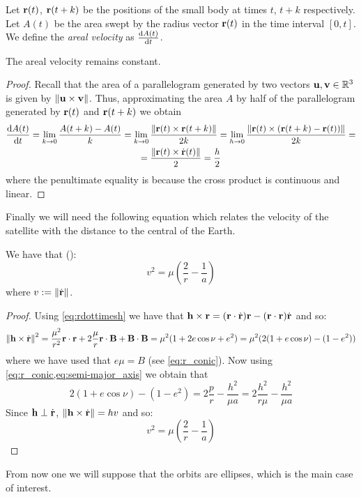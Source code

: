 \documentclass[../main.tex]{subfiles}
\begin{document}
\begin{definition}
  Let $\boldsymbol{\mathrm{r}}(t)$, $\boldsymbol{\mathrm{r}}(t+k)$ be the positions of the small body at times $t$, $t+k$ respectively. Let $A(t)$ be the area swept by the radius vector $\boldsymbol{\mathrm{r}}(t)$ in the time interval $[0,t]$. We define the \emph{areal velocity} as $\dv{A(t)}{t}$.
\end{definition}
\begin{proposition}
  The areal velocity remains constant.
\end{proposition}
\begin{proof}
  Recall that the area of a parallelogram generated by two vectors $\boldsymbol{\mathrm{u}},\boldsymbol{\mathrm{v}}\in\mathbb{R}^3$ is given by $\left\|\boldsymbol{\mathrm{u}}\times\boldsymbol{\mathrm{v}}\right\|$. Thus, approximating the area $A$ by half of the parallelogram generated by $\boldsymbol{\mathrm{r}}(t)$ and ${\boldsymbol{\mathrm{r}}}(t+k)$ we obtain
  \begin{multline}\label{eq:areal_velocity}
    \dv{A(t)}{t}=\lim_{k\to 0}\frac{A(t+k)-A(t)}{k}=\lim_{k\to 0}\frac{\left\|\boldsymbol{\mathrm{r}}(t)\times\boldsymbol{\mathrm{r}}(t+k)\right\|}{2k}=\lim_{h\to 0}\frac{\left\|\boldsymbol{\mathrm{r}}(t)\times(\boldsymbol{\mathrm{r}}(t+k)-\boldsymbol{\mathrm{r}}(t))\right\|}{2k}=\\
    =\frac{\left\|\boldsymbol{\mathrm{r}}(t)\times\dot{\boldsymbol{\mathrm{r}}}(t)\right\|}{2}=\frac{h}{2}
  \end{multline}
  where the penultimate equality is because the cross product is continuous and linear.
\end{proof}
Finally we will need the following equation which relates the velocity of the satellite with the distance to the central of the Earth.
\begin{proposition}
  We have that (\cite{montenbruck}):
  \begin{equation}\label{eq:visviva}
    v^2=\mu\left(\frac{2}{r}-\frac{1}{a}\right)
  \end{equation}
  where $v:=\left\|\dot{\boldsymbol{\mathrm{r}}}\right\|$.
\end{proposition}
\begin{proof}
  Using \cref{eq:rdottimesh} we have that $\boldsymbol{\mathrm{h}}\times\boldsymbol{\mathrm{r}}=(\boldsymbol{\mathrm{r}}\cdot\dot{\boldsymbol{\mathrm{r}}})\boldsymbol{\mathrm{r}}-(\boldsymbol{\mathrm{r}}\cdot{\boldsymbol{\mathrm{r}}})\dot{\boldsymbol{\mathrm{r}}}$ and so:
  \begin{equation}
    \left\|\boldsymbol{\mathrm{h}}\times\dot{\boldsymbol{\mathrm{r}}}\right\|^2=\frac{\mu^2}{r^2}\boldsymbol{\mathrm{r}}\cdot\boldsymbol{\mathrm{r}}+2\frac{\mu}{r}\boldsymbol{\mathrm{r}}\cdot\boldsymbol{\mathrm{B}}+\boldsymbol{\mathrm{B}} \cdot \boldsymbol{\mathrm{B}}=\mu^2(1+2 e\cos\nu + e^2)=\mu^2(2(1+ e\cos\nu) -(1- e^2))
  \end{equation}
  where we have used that $e\mu=B$ (see \cref{eq:r_conic}). Now using \cref{eq:r_conic,eq:semi-major_axis} we obtain that
  \begin{equation}
    2(1+ e\cos\nu) -(1- e^2)=2\frac{p}{r}-\frac{h^2}{\mu a}=2\frac{h^2}{r\mu}-\frac{h^2}{\mu a}
  \end{equation}
  Since $\boldsymbol{\mathrm{h}}\perp\dot{\boldsymbol{\mathrm{r}}}$, $\left\|\boldsymbol{\mathrm{h}}\times\dot{\boldsymbol{\mathrm{r}}}\right\|=hv$ and so:
  \begin{equation}
    v^2=\mu\left(\frac{2}{r}-\frac{1}{a}\right)
  \end{equation}
\end{proof}
From now one we will suppose that the orbits are ellipses, which is the main case of interest.
\end{document}
